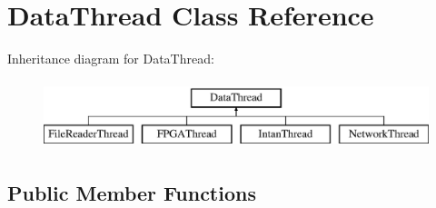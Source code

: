 \hypertarget{classDataThread}{\section{Data\-Thread Class Reference}
\label{classDataThread}
}
Inheritance diagram for Data\-Thread\-:\begin{figure}[H]
\begin{center}
\leavevmode
\includegraphics[height=2.000000cm]{classDataThread}
\end{center}
\end{figure}
\subsection*{Public Member Functions}
